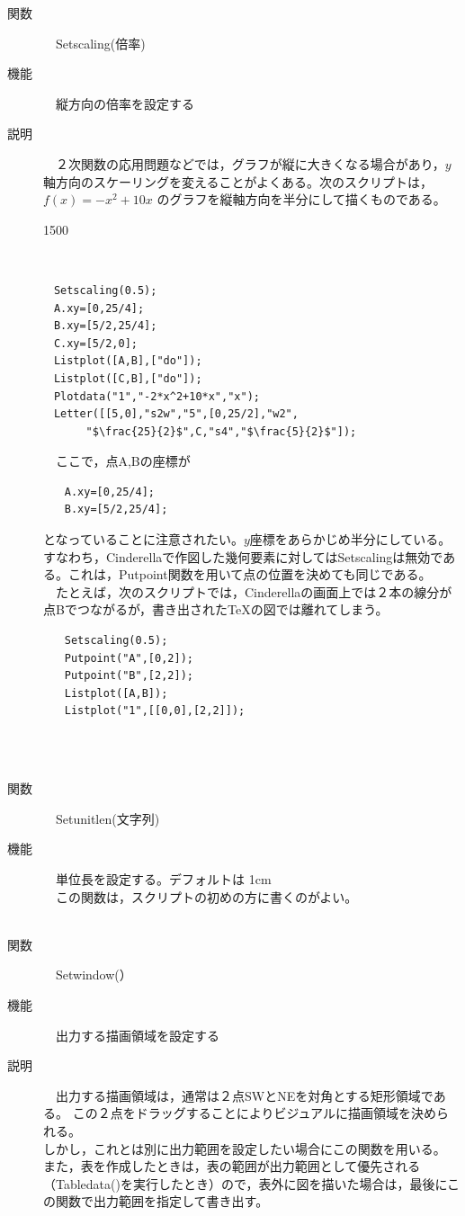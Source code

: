 \documentclass[papersize,a4paper,12pt,uplatex]{jsarticle}
\begin{document}
\begin{description}
\hypertarget{setscaling}{}
\item[関数]　Setscaling(倍率)
\item[機能]　縦方向の倍率を設定する
\item[説明]　２次関数の応用問題などでは，グラフが縦に大きくなる場合があり，$y$軸方向のスケーリングを変えることがよくある。次のスクリプトは，$f(x)=-x^2+10x$ のグラフを縦軸方向を半分にして描くものである。\\
\begin{layer}{150}{0}
\end{layer}
　\\
\begin{verbatim}
　Setscaling(0.5);
　A.xy=[0,25/4];
　B.xy=[5/2,25/4];
　C.xy=[5/2,0];
　Listplot([A,B],["do"]);
　Listplot([C,B],["do"]);
　Plotdata("1","-2*x^2+10*x","x");
　Letter([[5,0],"s2w","5",[0,25/2],"w2",
　　　　"$\frac{25}{2}$",C,"s4","$\frac{5}{2}$"]);
\end{verbatim}
　ここで，点A,Bの座標が
\begin{verbatim}
　　A.xy=[0,25/4];
　　B.xy=[5/2,25/4];
\end{verbatim}
となっていることに注意されたい。$y$座標をあらかじめ半分にしている。すなわち，Cinderellaで作図した幾何要素に対してはSetscalingは無効である。これは，Putpoint関数を用いて点の位置を決めても同じである。\\
　たとえば，次のスクリプトでは，Cinderellaの画面上では２本の線分が点Bでつながるが，書き出された\TeX の図では離れてしまう。
\begin{verbatim}
　　Setscaling(0.5);
　　Putpoint("A",[0,2]);
　　Putpoint("B",[2,2]);
　　Listplot([A,B]);
　　Listplot("1",[[0,0],[2,2]]);
\end{verbatim}
　\\
　\\
\hypertarget{setunitlen}{}
\item[関数]　Setunitlen(文字列)
\item[機能]　単位長を設定する。デフォルトは 1cm\\
　この関数は，スクリプトの初めの方に書くのがよい。\\
　\\
\hypertarget{setwindow}{}
\item[関数]　Setwindow(）
\item[機能]　出力する描画領域を設定する\\
\item[説明]　出力する描画領域は，通常は２点SWとNEを対角とする矩形領域である。
この２点をドラッグすることによりビジュアルに描画領域を決められる。\\
しかし，これとは別に出力範囲を設定したい場合にこの関数を用いる。\\
また，表を作成したときは，表の範囲が出力範囲として優先される（Tabledata()を実行したとき）ので，表外に図を描いた場合は，最後にこの関数で出力範囲を指定して書き出す。\\
　\\


\end{description}
\end{document}
